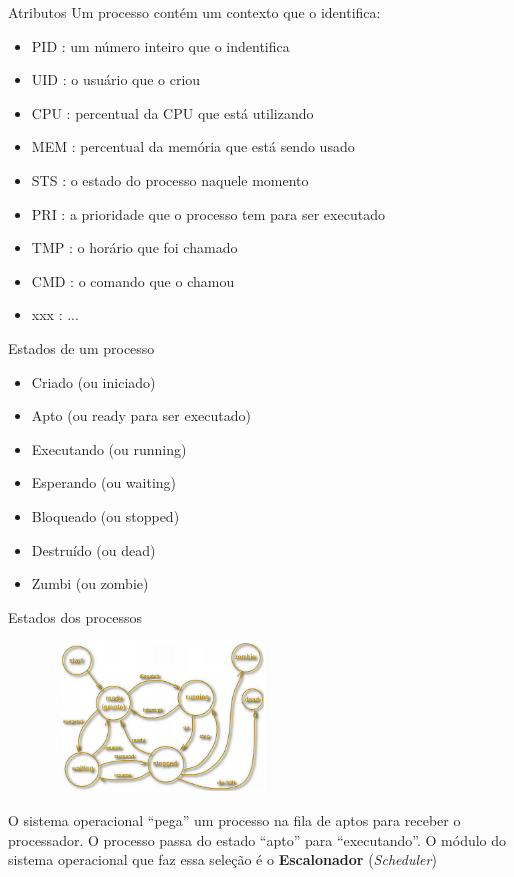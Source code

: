 \documentclass[11pt]{beamer}
\begin{document}
\begin{frame}{Atributos}
Um processo contém um contexto que o identifica:
 \begin{itemize}
 \item PID : um número inteiro que o indentifica
 \item UID : o usuário que o criou 
 \item CPU : percentual da CPU que está utilizando
 \item MEM : percentual da memória que está sendo usado
 \item STS : o estado do processo naquele momento
 \item PRI : a prioridade que o processo tem para ser executado
 \item TMP : o horário que foi chamado
 \item CMD : o comando que o chamou
 \item xxx : ...

 \end{itemize}
\end{frame}



\begin{frame}{Estados de um processo}
\begin{itemize}
 \item Criado (ou iniciado)
 \item Apto (ou ready para ser executado)
 \item Executando (ou running)
 \item Esperando	  (ou waiting)
 \item Bloqueado (ou stopped)
 \item Destruído (ou dead)
 \item Zumbi (ou zombie)
\end{itemize}
\end{frame}

\begin{frame}{Estados dos processos}
\begin{figure}[h]
 \includegraphics[width=61mm, height=40mm]{Figuras/statusProc.png}
\end{figure}
O sistema operacional ``pega'' um processo na fila de aptos para receber o processador.
O processo passa do estado ``apto'' para ``executando''.
O módulo do sistema operacional que faz essa seleção é o \textbf{Escalonador} (\textit{Scheduler})
\end{frame}
\end{document}

